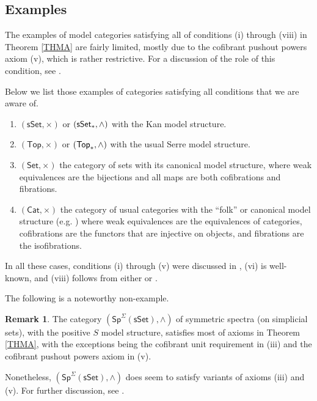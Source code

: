 \documentclass[a4paper,10pt
 ,final
]{article}%
\numberwithin{equation}{section}
\numberwithin{figure}{section}
\theoremstyle{definition} %
\newtheorem{remark}[equation]{Remark}%
\newcommand{\Cat}{\mathsf{Cat}}
\newcommand{\1}{\ensuremath{\mathbbm 1}}%
\begin{document}
\subsection{Examples}\label{EXAMPLES SEC}



The examples of 
model categories satisfying 
all of conditions (i) through (viii)
in Theorem \ref{THMA}
are fairly limited, 
mostly due to 
the cofibrant pushout powers axiom (v),
which is rather restrictive.
For a discussion of the role of this condition,
see \cite[Rems. \ref{OC-CPPWHY REM} and
\ref{OC-SPNONEX REM}]{BP_FCOP}.

Below we list those examples of categories satisfying all conditions that we are aware of.
\begin{enumerate}[label = (\alph*)]
\item $(\mathsf{sSet},\times)$ or $(\mathsf{sSet}_{\**},\wedge)$
with the Kan model structure.
\item $(\mathsf{Top},\times)$ or $(\mathsf{Top}_{\**},\wedge)$
with the usual Serre model structure.
\item $(\mathsf{Set},\times)$ the category of sets with its canonical model structure,
where weak equivalences are the bijections and all maps are both cofibrations and fibrations.
\item $(\Cat,\times)$ the category of usual categories
with the ``folk'' or canonical model structure (e.g. \cite{Rez})
where weak equivalences are the equivalences of categories,
cofibrations are the functors that are injective on objects,
and fibrations are the isofibrations.
\end{enumerate}
In all these cases, conditions (i) through (v)
were discussed in \cite[\S \ref{OC-EXAMPLES SEC}]{BP_FCOP},
(vi) is well-known,
and (viii) follows from either \cite[Lemma 1.12]{BM13} 
or \cite[Lemma 2.1]{BM13}.



The following is a noteworthy 
non-example. 


\begin{remark}
	The category $(\mathsf{Sp}^{\Sigma}(\mathsf{sSet}),\wedge)$
	of symmetric spectra (on simplicial sets),
	with the positive $S$ model structure,
	satisfies most of axioms in Theorem
	\ref{THMA}, 
	with the exceptions being 
	the cofibrant unit requirement in (iii)
	and the cofibrant pushout powers axiom in (v).
	
	Nonetheless, $(\mathsf{Sp}^{\Sigma}(\mathsf{sSet}),\wedge)$
	does seem to satisfy variants of axioms 
	(iii) and (v). For further discussion, 
	see \cite[Rem. \ref{OC-SPNONEX REM}]{BP_FCOP}.
\end{remark}
\end{document}
